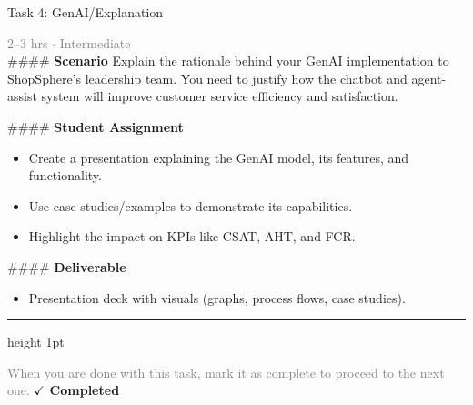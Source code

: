 \documentclass[10pt,a4paper]{article}
\begin{document}
\begin{taskbox}{Task 4: GenAI/Explanation}

    {\small \textcolor{gray}{2--3 hrs $\cdot$ Intermediate}}\\[12pt]

    \#\#\#\# \textbf{Scenario}  
Explain the rationale behind your GenAI implementation to ShopSphere’s leadership team. You need to justify how the chatbot and agent-assist system will improve customer service efficiency and satisfaction.  

\#\#\#\# \textbf{Student Assignment}  
\begin{itemize}
    \item Create a presentation explaining the GenAI model, its features, and functionality.  
    \item Use case studies/examples to demonstrate its capabilities.  
    \item Highlight the impact on KPIs like CSAT, AHT, and FCR.  
\end{itemize}

\#\#\#\# \textbf{Deliverable}  
\begin{itemize}
    \item Presentation deck with visuals (graphs, process flows, case studies).\par
\end{itemize}

    \vspace{16pt}

    \textcolor{cardBorder}{\hrule height 1pt}\vspace{8pt}

    \small \textcolor{gray}{When you are done with this task, mark it as complete to proceed to the next one.} \hfill \textbf{\textcolor{brandDark}{$\checkmark$ Completed}}

\end{taskbox}
\end{document}
